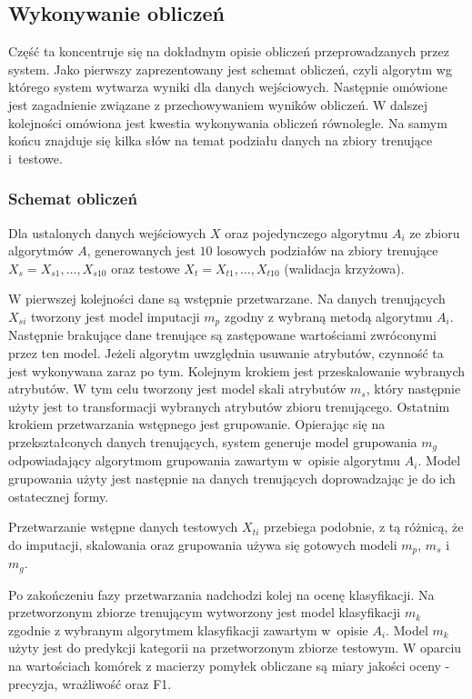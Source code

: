 \documentclass[../thesis.tex]{subfiles}
\begin{document}
\subsection{Wykonywanie obliczeń}

Część ta koncentruje się na dokładnym opisie obliczeń przeprowadzanych przez system. Jako pierwszy zaprezentowany jest schemat obliczeń, czyli algorytm wg którego system wytwarza wyniki dla danych wejściowych. Następnie omówione jest zagadnienie związane z przechowywaniem wyników obliczeń. W dalszej kolejności omówiona jest kwestia wykonywania obliczeń równolegle. Na samym końcu znajduje się kilka słów na temat podziału danych na zbiory trenujące i~testowe.

\subsubsection{Schemat obliczeń}
\label{req:research_scheme}

Dla ustalonych danych wejściowych $X$ oraz pojedynczego algorytmu $A_i$ ze zbioru algorytmów $A$, generowanych jest $10$ losowych podziałów na zbiory trenujące $X_{s} = X_{s1}, \ldots, X_{s10}$ oraz testowe $X_{t} = X_{t1}, \ldots, X_{t10}$ (walidacja krzyżowa).

W pierwszej kolejności dane są wstępnie przetwarzane. Na danych trenujących $X_{si}$ tworzony jest model imputacji $m_{p}$ zgodny z wybraną metodą algorytmu $A_i$. Następnie brakujące dane trenujące są zastępowane wartościami zwróconymi przez ten model. Jeżeli algorytm uwzględnia usuwanie atrybutów, czynność ta jest wykonywana zaraz po tym. Kolejnym krokiem jest przeskalowanie wybranych atrybutów. W tym celu tworzony jest model skali atrybutów $m_{s}$, który następnie użyty jest to transformacji wybranych atrybutów zbioru trenującego. Ostatnim krokiem przetwarzania wstępnego jest grupowanie. Opierając się na przekształconych danych trenujących, system generuje model grupowania $m_{g}$ odpowiadający algorytmom grupowania zawartym w~opisie algorytmu $A_i$. Model grupowania użyty jest następnie na danych trenujących doprowadzając je do ich ostatecznej formy.

Przetwarzanie wstępne danych testowych $X_{ti}$ przebiega podobnie, z tą różnicą, że do imputacji, skalowania oraz grupowania używa się gotowych modeli $m_p$, $m_s$ i~$m_g$.

Po zakończeniu fazy przetwarzania nadchodzi kolej na ocenę klasyfikacji. Na przetworzonym zbiorze trenującym wytworzony jest model klasyfikacji $m_k$ zgodnie z wybranym algorytmem klasyfikacji zawartym w~opisie $A_i$. Model $m_k$ użyty jest do predykcji kategorii na przetworzonym zbiorze testowym. W oparciu na wartościach komórek z macierzy pomyłek obliczane są miary jakości oceny - precyzja, wrażliwość oraz F1. 
\end{document}

